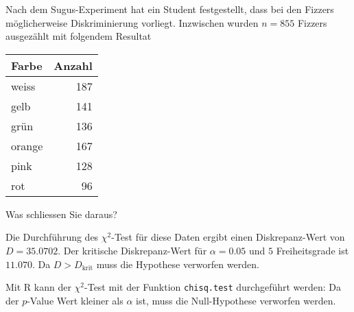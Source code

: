 Nach dem Sugus-Experiment hat ein Student festgestellt, dass bei den
Fizzers möglicherweise Diskriminierung vorliegt. Inzwischen wurden
$n=855$ Fizzers ausgezählt mit folgendem Resultat
\begin{center}
\begin{tabular}{|l|r|}
\hline
Farbe&Anzahl\\
\hline
weiss&187\\
gelb&141\\
grün&136\\
orange&167\\
pink&128\\
rot&96\\
\hline
\end{tabular}
\end{center}
Was schliessen Sie daraus?


\begin{loesung}
Die Durchführung des $\chi^2$-Test für diese Daten ergibt
einen Diskrepanz-Wert von $D=35.0702$. Der kritische Diskrepanz-Wert
für $\alpha = 0.05$ und $5$ Freiheitsgrade ist $11.070$. Da
$D>D_{\text{krit}}$ muss die Hypothese verworfen werden.

Mit R kann der $\chi^2$-Test mit der Funktion {\tt chisq.test} durchgeführt
werden:
Da der $p$-Value Wert kleiner als $\alpha$ ist, muss die
Null-Hypothese verworfen werden.
\end{loesung}
